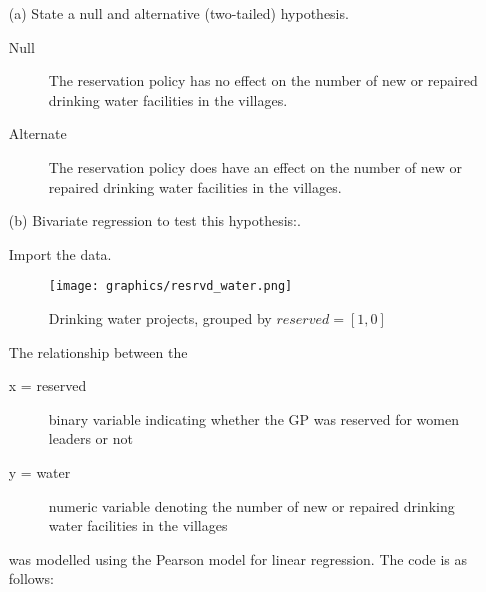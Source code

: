 \documentclass[12pt,letterpaper]{article}
\begin{document}
\begin{enumerate}
	\item [(a)] State a null and alternative (two-tailed) hypothesis. 
	
	\begin{description}
	  \item [Null] The reservation policy has no effect on the number of new or 
	  repaired drinking water facilities in the villages.
	  \item [Alternate] The reservation policy does have an effect on the number of new or 
	  repaired drinking water facilities in the villages.
	\end{description}
	
	\begin{comment}
	
	The data is as follows: 

| [,3] `reserved`~~ binary variable indicating whether the GP was reserved for women leaders or not
| [,4] `female` ~~binary variable indicating whether the GP had a female leader or not
| [,5] `irrigation` ~~variable measuring the number of new or repaired irrigation facilities in the village since the reserve policy started
| [,6] `water` ~~variable measuring the number of new or repaired drinking-water facilities in the village since the reserve policy started

  \end{comment}

	\item [(b)] Bivariate regression to test this hypothesis:.

  Import the data.

	  
	
  \begin{figure}[htb!]
	\caption{\footnotesize{Drinking water projects, grouped by $reserved = [1,0]$}}
	\vspace{.5cm}
	\centering
	\label{fig:water_reserved}
	\texttt{[image: graphics/resrvd\_water.png]}
  \end{figure}		
	
	
  The relationship between the 
  \begin{description}
    \item[x = reserved] binary variable indicating whether the GP was reserved for 
  women leaders or not
    \item[y = water] numeric variable denoting the number of new or repaired 
    drinking water facilities in the villages
  \end{description}
  was modelled using the Pearson model for linear regression.  The code is as follows:


\end{enumerate}
\end{document}
